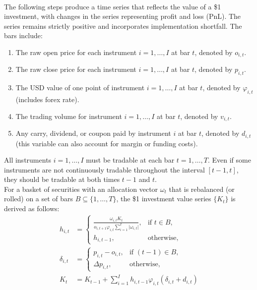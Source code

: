 \begin{method} \\
The following steps produce a time series that reflects the value of a \$1 investment, with changes in the series representing profit and loss (PnL). The series remains strictly positive and incorporates implementation shortfall. The bars include:
\begin{enumerate}[label=\roman*.]
\setlength{\itemsep}{0pt}
\item The raw open price for each instrument $i = 1, \ldots, I$ at bar $t$, denoted by $o_{i,t}$.
\item The raw close price for each instrument $i = 1, \ldots, I$ at bar $t$, denoted by $p_{i,t}$.
\item The USD value of one point of instrument $i = 1, \ldots, I$ at bar $t$, denoted by $\varphi_{i,t}$ (includes forex rate).
\item The trading volume for instrument $i = 1, \ldots, I$ at bar $t$, denoted by $v_{i,t}$.
\item Any carry, dividend, or coupon paid by instrument $i$ at bar $t$, denoted by $d_{i,t}$ (this variable can also account for margin or funding costs).
\end{enumerate}
All instruments $i = 1, \ldots, I$ must be tradable at each bar $t = 1, \ldots, T$. Even if some instruments are not continuously tradable throughout the interval $[t-1, t]$, they should be tradable at both times $t-1$ and $t$.\\
For a basket of securities with an allocation vector $\omega_t$ that is rebalanced (or rolled) on a set of bars $B \subseteq \{1, \ldots, T \}$, the \$1 investment value series $\{K_t\}$ is derived as follows:
\begin{align}
h_{i,t} &= 
\begin{cases}
\displaystyle \frac{\omega_{i,t} K_t}{o_{i, t+1} \varphi_{i,t} \sum_{i=1}^I \lvert \omega_{i,t} \rvert} , & \text{if } t \in B, \\[1ex]
h_{i, t-1}, & \text{otherwise,}
\end{cases} \nonumber \\
\delta_{i,t} &=
\begin{cases}
p_{i,t} - o_{i,t}, & \text{if } (t-1) \in B, \\
\Delta p_{i,t}, & \text{otherwise,}
\end{cases} \nonumber \\
K_t &= K_{t-1} + \sum_{i=1}^I h_{i, t-1} \varphi_{i,t} (\delta_{i,t} + d_{i,t}) \nonumber
\end{align}

\end{method}
